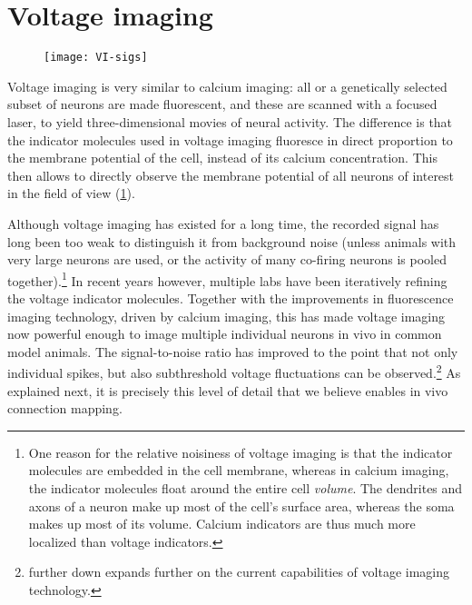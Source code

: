 \FloatBarrier
\section{Voltage imaging}

\begin{figure}
    \texttt{[image: VI-sigs]}
    \label{fig:VI-sigs}
\end{figure}

Voltage imaging is very similar to calcium imaging: all or a genetically selected subset of neurons are made fluorescent, and these are scanned with a focused laser, to yield three-dimensional movies of neural activity.\cite{Knopfel2019OpticalVoltageImaging}
The difference is that the indicator molecules used in voltage imaging fluoresce in direct proportion to the membrane potential of the cell, instead of its calcium concentration. This then allows to directly observe the membrane potential of all neurons of interest in the field of view (\cref{fig:VI-sigs}).

Although voltage imaging has existed for a long time, the recorded signal has long been too weak to distinguish it from background noise (unless animals with very large neurons are used, or the activity of many co-firing neurons is pooled together).\footnote{
    One reason for the relative noisiness of voltage imaging is that the indicator molecules are embedded in the cell membrane, whereas in calcium imaging, the indicator molecules float around the entire cell \emph{volume}. The dendrites and axons of a neuron make up most of the cell's surface area, whereas the soma makes up most of its volume. Calcium indicators are thus much more localized than voltage indicators.
}
In recent years however, multiple labs have been iteratively refining the voltage indicator molecules. Together with the improvements in fluorescence imaging technology, driven by calcium imaging, this has made voltage imaging now powerful enough to image multiple individual neurons in vivo in common model animals. The signal-to-noise ratio has improved to the point that not only individual spikes, but also subthreshold voltage fluctuations can be observed.\footnote{
     further down expands further on the current capabilities of voltage imaging technology.
}
As explained next, it is precisely this level of detail that we believe enables in vivo connection mapping.


